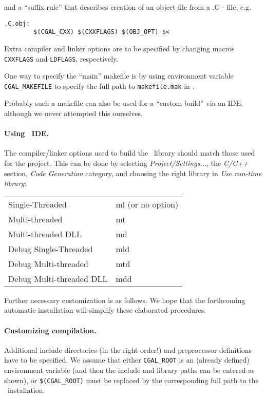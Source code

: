 and a ``suffix rule'' that describes creation of an object file from a
.C - file, e.g.
\begin{verbatim}
.C.obj:
        $(CGAL_CXX) $(CXXFLAGS) $(OBJ_OPT) $<
\end{verbatim}

Extra compiler and linker options are to be specified by changing
macros \texttt{CXXFLAGS} and \texttt{LDFLAGS}, respectively.

One way to specify the ``main'' makefile is by using environment
variable \texttt{CGAL\_MAKEFILE} to specify the full path to 
\texttt{makefile.mak} in
\CGALR .

Probably such a makefile can also be used for a ``custom build'' via an
IDE, although we never attempted this ourselves.


\paragraph{Using \msvc\ IDE.}
The compiler/linker options used to build the \cgal\ library should
match those used for the project. This can be done by
selecting {\em Project/Settings...}, the {\em C/C++} section,
{\em Code Generation} category, and choosing the right
library in {\em Use run-time library}:

\begin{tabular}{|l|l|} \hline
Single-Threaded&                 ml (or no option)\\
Multi-threaded &                 mt\\
Multi-threaded DLL&              md\\
Debug Single-Threaded &          mld\\
Debug Multi-threaded   &         mtd\\
Debug Multi-threaded DLL&        mdd\\\hline
\end{tabular}

Further necessary customization is as follows.
We hope that the forthcoming automatic installation will simplify
these elaborated procedures.


\paragraph{Customizing compilation.}
Additional include directories (in the right order!) and preprocessor
definitions have to be specified.  We assume that either 
\texttt{CGAL\_ROOT} is
an (already defined) environment variable (and then the include and
library paths can be entered as shown), or 
\texttt{\$(CGAL\_ROOT)} must be
replaced by the corresponding full path to the \cgal\ installation.

